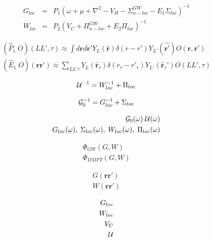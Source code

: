\documentclass[usenames,letter,landscape,semhelv]{seminar}
\newcommand{\vr}{{\mathbf{r}}}
\begin{document}
\begin{slide}
\newslide

\begin{eqnarray}
G_{loc} &=& P_1 \left(\omega + \mu + \nabla^2 -V_{H}-\Sigma_{n-loc}^{GW}-E_1 \Sigma_{loc}\right)^{-1}\nonumber\\
W_{loc} &=& P_2 \left(V_C + \Pi_{n-loc}^{GW} + E_2 \Pi_{loc}\right)^{-1}\nonumber
\end{eqnarray}

\begin{eqnarray}
(\hat{P}_1\; O )(LL',\tau)\approx  \int d\vr d\vr' Y_L(\hat{\vr})\delta(r-r') Y_{L'}(\hat{\vr'})O(\vr,\vr')\nonumber\\
(\hat{E}_1\; O)(\vr\vr') \approx \sum_{L L'\tau} Y_L(\hat{\vr}_\tau )\delta(r_\tau
-r'_\tau) Y_{L'}(\hat{\vr}_\tau') O(LL',\tau)\nonumber
\end{eqnarray}

\begin{equation}
{\cal U}^{-1} = W_{loc}^{-1} + \Pi_{loc}\nonumber
\end{equation}

\begin{equation}
{\cal G}_0^{-1} = G_{loc}^{-1} + \Sigma_{loc}\nonumber
\end{equation}

\begin{eqnarray}
{\cal G}_0(\omega) \; {\cal U}(\omega)\\
G_{loc}(\omega),\; \Sigma_{loc}(\omega),\; W_{loc}(\omega),\; \Pi_{loc}(\omega)
\end{eqnarray}

\begin{eqnarray}
\Phi_{GW}(G,W)\\
\Phi_{DMFT}(G,W)
\end{eqnarray}

\begin{eqnarray}
G(\vr\vr')\\
W(\vr\vr')
\end{eqnarray}

\begin{eqnarray}
G_{loc}\\
W_{loc}\\
V_C\\
{\cal U}
\end{eqnarray}

\end{slide}
\end{document}
